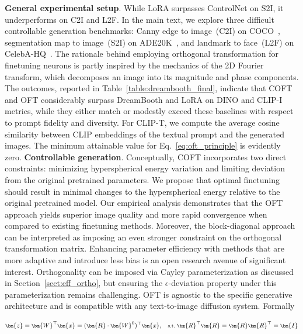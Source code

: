 \textbf{General experimental setup}. While LoRA surpasses ControlNet on S2I, it underperforms on C2I and L2F. In the main text, we explore three difficult controllable generation benchmarks: Canny edge to image~(C2I) on COCO~\cite{lin2014microsoft}, segmentation map to image~(S2I) on ADE20K~\cite{zhou2017scene}, and landmark to face~(L2F) on CelebA-HQ~\cite{karras2018progressive,xia2021tedigan}. The rationale behind employing orthogonal transformation for finetuning neurons is partly inspired by the mechanics of the 2D Fourier transform, which decomposes an image into its magnitude and phase components. The outcomes, reported in Table~\ref{table:dreambooth_final}, indicate that COFT and OFT considerably surpass DreamBooth and LoRA on DINO and CLIP-I metrics, while they either match or modestly exceed these baselines with respect to prompt fidelity and diversity. For CLIP-T, we compute the average cosine similarity between CLIP embeddings of the textual prompt and the generated images. The minimum attainable value for Eq.~\eqref{eq:oft_principle} is evidently zero. \textbf{Controllable generation}. Conceptually, COFT incorporates two direct constraints: minimizing hyperspherical energy variation and limiting deviation from the original pretrained parameters. We propose that optimal finetuning should result in minimal changes to the hyperspherical energy relative to the original pretrained model. Our empirical analysis demonstrates that the OFT approach yields superior image quality and more rapid convergence when compared to existing finetuning methods. Moreover, the block-diagonal approach can be interpreted as imposing an even stronger constraint on the orthogonal transformation matrix. Enhancing parameter efficiency with methods that are more adaptive and introduce less bias is an open research avenue of significant interest. Orthogonality can be imposed via Cayley parameterization as discussed in Section~\ref{sect:eff_ortho}, but ensuring the $\epsilon$-deviation property under this parameterization remains challenging. OFT is agnostic to the specific generative architecture and is compatible with any text-to-image diffusion system. Formally

\begin{equation}\label{eq:oft_general}
    \footnotesize
    \bm{z}=\bm{W}^\top\bm{x}=(\bm{R}\cdot\bm{W}^0)^\top\bm{x},~~~\text{s.t.}~\bm{R}^\top\bm{R}=\bm{R}\bm{R}^\top=\bm{I}
\end{equation}

